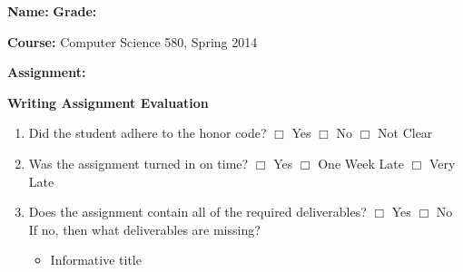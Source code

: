 \documentclass[letterpaper, 10pt]{article} %
\begin{document}
\pagestyle{empty}

\vspace*{-1in}

\noindent
{\bf Name:} \hspace*{4.8in} {\bf Grade:} 

\vspace*{.1in}

\noindent
{\bf Course:} Computer Science 580, Spring 2014

\vspace*{.1in}

\noindent
{\bf Assignment:} 

\vspace*{.1in}

\large{

\begin{center}{\bf Writing Assignment Evaluation} \end{center}

\begin{enumerate}

\setlength{\itemsep}{.5pt}

\item Did the student adhere to the honor code? \hspace*{.05in}  $\Box$ Yes
  \hspace*{.05in} $\Box$ No \hspace*{.05in}  $\Box$ Not Clear

\item Was the assignment turned in on time? \hspace*{.05in}  $\Box$ Yes
  \hspace*{.05in} $\Box$ One Week Late \hspace*{.05in} $\Box$ Very
  Late

\item Does the assignment contain all of the required
  deliverables? \hspace*{.05in} $\Box$ Yes
  \hspace*{.05in} $\Box$ No \\ \hspace*{.05in} If no, then what
  deliverables are missing? \vspace*{-.05in}

\begin{itemize}
\renewcommand{\labelitemi}{$\Box$}

\setlength{\itemsep}{.5pt}

\item Informative title


\end{itemize}
\end{enumerate}}
\end{document}
